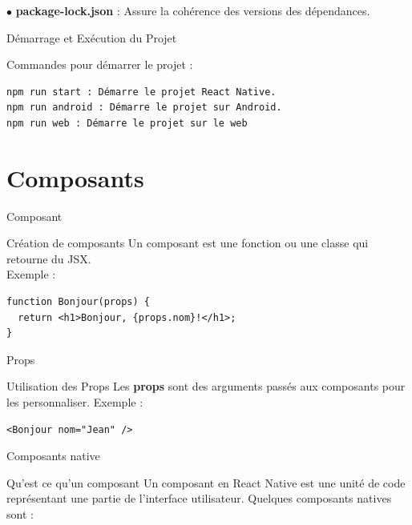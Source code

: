 \documentclass[5pt]{beamer}
\begin{document}
{\begin{frame}[fragile]{}
\begin{block}{}
 $ \bullet $ \textbf{package-lock.json} : Assure la cohérence des versions des
dépendances.
    \end{block}
\end{frame}

\begin{frame}[fragile]{Démarrage et Exécution du Projet}
\begin{block}{}
Commandes pour démarrer le projet :
\begin{lstlisting}
npm run start : Démarre le projet React Native.
npm run android : Démarre le projet sur Android.
npm run web : Démarre le projet sur le web
 \end{lstlisting}
    \end{block}
\end{frame}
















\section{Composants }
\begin{frame}[fragile]{Composant}
\begin{block}{Création de composants}
Un composant est une fonction ou une classe qui retourne du JSX.\\
Exemple :
\begin{lstlisting}
function Bonjour(props) {
  return <h1>Bonjour, {props.nom}!</h1>;
}
\end{lstlisting}
    \end{block}
\end{frame}

\begin{frame}[fragile]{Props}
\begin{block}{Utilisation des Props}
Les \textbf{props} sont des arguments passés aux composants pour les personnaliser. Exemple :
\begin{lstlisting}
<Bonjour nom="Jean" />
\end{lstlisting}
    \end{block}
\end{frame}

\begin{frame}[fragile]{Composants native}
\begin{block}{Qu'est ce qu'un composant}
Un composant en React Native est une unité de code représentant
une partie de l’interface utilisateur.
Quelques composants natives sont :
   \end{block}
\end{frame}

}
\end{document}
